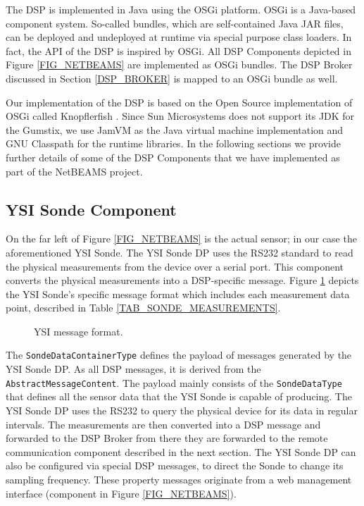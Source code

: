 \documentclass[conference]{IEEEtran}
\begin{document}
The DSP is implemented in Java using the OSGi platform. OSGi
\cite{osgi} is a Java-based component system. So-called bundles, which
are self-contained Java JAR files, can be deployed and undeployed at
runtime via special purpose class loaders. In fact, the API of the DSP
is inspired by OSGi. All DSP Components depicted in Figure
\ref{FIG_NETBEAMS} are implemented as OSGi bundles. The DSP Broker
discussed in Section \ref{DSP_BROKER} is mapped to an OSGi bundle as well.

Our implementation of the DSP is based on the Open Source
implementation of OSGi called Knopflerfish \cite{knopflerfish01}.
Since Sun Microsystems does not support its JDK for the Gumstix, we
use JamVM \cite{jamvm01} as the Java virtual machine implementation
and GNU Classpath \cite{classpath01} for the runtime libraries. In the
following sections we provide further details of some of the DSP
Components that we have implemented as part of the NetBEAMS project.

\subsection{YSI Sonde Component}

On the far left of Figure \ref{FIG_NETBEAMS} is the actual sensor; in
our case the aforementioned YSI Sonde. The YSI Sonde DP 
uses the RS232 standard to read the physical measurements from the
device over a serial port.  This component converts the physical
measurements into a DSP-specific message. Figure
\ref{FIG_DSP_YSI_DATA} depicts the YSI Sonde's specific message format
which includes each measurement data point, described in Table
\ref{TAB_SONDE_MEASUREMENTS}.

\begin{figure}[!htb]
\centering
{}
\caption{\label{FIG_DSP_YSI_DATA} YSI message format.}
\end{figure}

The \texttt{SondeDataContainerType} defines the payload of messages generated
by the YSI Sonde DP. As all DSP messages, it is derived from the
\texttt{AbstractMessageContent}. The payload mainly consists of the
\texttt{SondeDataType} that defines all the sensor data that the YSI Sonde is
capable of producing. The YSI Sonde DP uses the RS232 to query the
physical device for its data in regular intervals. The measurements
are then converted into a DSP message and forwarded to the DSP Broker
from there they are forwarded to the remote communication component
described in the next section.  The YSI Sonde DP can also be
configured via special DSP messages, to direct the Sonde to change its
sampling frequency.  These property messages originate from a web
management interface (component  in Figure \ref{FIG_NETBEAMS}).
\end{document}
